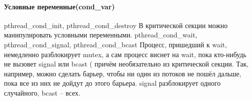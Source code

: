 \documentclass[a4paper,10pt]{article}
\begin{document}
\paragraph{Условные переменные(cond\_var)}
pthread\_cond\_init, pthread\_cond\_destroy
В критической секции можно манипулировать условными переменными.
pthread\_cond\_wait, pthread\_cond\_signal, pthread\_cond\_bcast
Процесс, пришедший к wait, немедленно разблокирует mutex, а сам процесс виснет на wait, пока кто-нибудь не вызовет signal или bcast ( причём необязательно из критической секции. Так, например, можно сделать барьер, чтобы ни один из потоков не пошёл дальше, пока все из них не дойдут до этого барьера.
signal разблокирует одного случайного, bcast -- всех.
\end{document}
